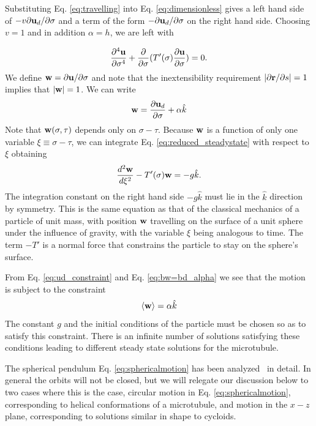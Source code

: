 \documentclass[pre,showpacs]{revtex4}
\def\br{{\bf r}}
\def\bu{{\bf u}}
\def\bw{{\bf w}}
\begin{document}
Substituting Eq. \ref{eq:travelling} into Eq. \ref{eq:dimensionless} gives a left hand side
of $-v \partial \bu_d/\partial \sigma$ and a term of the form $-\partial \bu_d/\partial \sigma$ on
the right hand side. Choosing $v = 1$ and in addition $\alpha = h$, we are left with

\begin{equation}
\label{eq:reduced_steadystate}
\frac{\partial^4 \bu}{\partial \sigma^4} + \frac{\partial}{\partial \sigma}(T'(\sigma)\frac{\partial \bu}{\partial \sigma}) = 0.
\end{equation}
We define $\bw = \partial \bu/\partial \sigma$  and
note that the inextensibility requirement $|\partial \br/\partial s| = 1$ implies that $|\bw| = 1$. We can write 
\begin{equation}
\label{eq:bw=bd_alpha}
\bw  = \frac{\partial \bu_d}{\partial \sigma} + \alpha {\hat k}
\end{equation}
Note that $\bw(\sigma,\tau)$ depends only on $\sigma -\tau$. Because $\bw$ is a function
of only one variable $\xi \equiv \sigma -\tau$, 
we can 
integrate Eq. \ref{eq:reduced_steadystate} with respect to $\xi$ obtaining
\begin{equation}
\label{eq:sphericalmotion}
\frac{d^2 \bw}{d \xi^2} - T'(\sigma)\bw = -g {\hat k}.
\end{equation}
The integration constant on the right hand side $-g {\hat k}$ must lie in the $\hat k$ direction by symmetry.
This is the same equation as that of the classical mechanics of a particle of unit mass, with position $\bw$ travelling on the surface of a 
unit sphere under the influence of gravity, with the variable $\xi$ being analogous to time. The term $-T'$ is a normal
force that constrains the particle to stay on the sphere's surface.

From Eq. \ref{eq:ud_constraint} and Eq. \ref{eq:bw=bd_alpha} we see that the motion is subject to the
constraint
\begin{equation}
\label{eq:alpha_constraint}
\langle \bw \rangle = \alpha {\hat k}
\end{equation}
The constant $g$ and the initial conditions of the particle must be chosen so as to satisfy this constraint.
There is an infinite number of solutions satisfying these conditions leading to different 
steady state solutions for the microtubule.

The spherical pendulum Eq. \ref{eq:sphericalmotion} has been analyzed~\cite{CushmanBates} in detail. In general
the orbits will not be closed, but we will relegate
our discussion below to two cases where this is the case, circular motion in Eq. \ref{eq:sphericalmotion}, corresponding to helical
conformations of a microtubule, and motion in the $x-z$ plane, corresponding to solutions similar in shape to cycloids.
\end{document}
